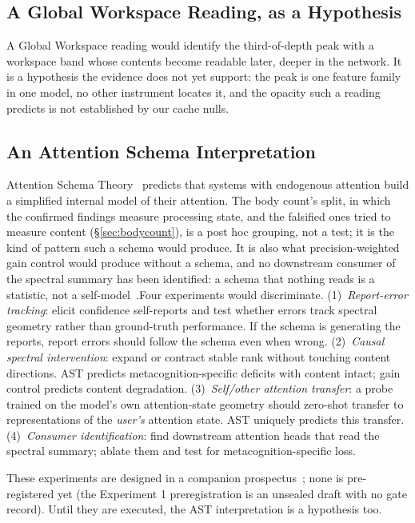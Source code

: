 \documentclass[11pt,a4paper]{article}
\begin{document}
\subsection{A Global Workspace Reading, as a Hypothesis}

A Global Workspace reading would identify the third-of-depth peak with a
workspace band whose contents become readable later, deeper in the
network. It is a hypothesis the evidence does not yet support: the peak is one
feature family in one model, no other instrument locates it, and the
opacity such a reading predicts is not established by our cache nulls.

\subsection{An Attention Schema Interpretation}

Attention Schema Theory~\citep{graziano2015attention} predicts that
systems with endogenous attention build a simplified internal model of
their attention. The body count's split, in which the confirmed findings measure processing state, and the falsified ones tried to measure content
(\S\ref{sec:bodycount}), is a post hoc grouping, not a test; it is the
kind of pattern such a schema would produce.
It is also what precision-weighted gain control would produce without a
schema, and no downstream consumer of the spectral summary has been
identified: a schema that nothing reads is a statistic, not a
self-model~\citep{graziano2015attention}.Four experiments would discriminate. (1)~\emph{Report-error tracking}:
elicit confidence self-reports and test whether errors track spectral
geometry rather than ground-truth performance. If the schema is
generating the reports, report errors should follow the schema even
when wrong. (2)~\emph{Causal spectral intervention}: expand or
contract stable rank without touching content directions. AST predicts
metacognition-specific deficits with content intact; gain control
predicts content degradation. (3)~\emph{Self/other attention transfer}:
a probe trained on the model's own attention-state geometry should
zero-shot transfer to representations of the \emph{user's} attention
state.
AST uniquely predicts this transfer. (4)~\emph{Consumer identification}:
find downstream attention heads that read the spectral summary;
ablate them and test for metacognition-specific loss.

These experiments are designed in a companion
prospectus~\citep{lyra2026ast_experiments}; none is pre-registered yet
(the Experiment 1 preregistration is an unsealed draft with no gate
record). Until they are executed,
the AST interpretation is a hypothesis too.
\end{document}
